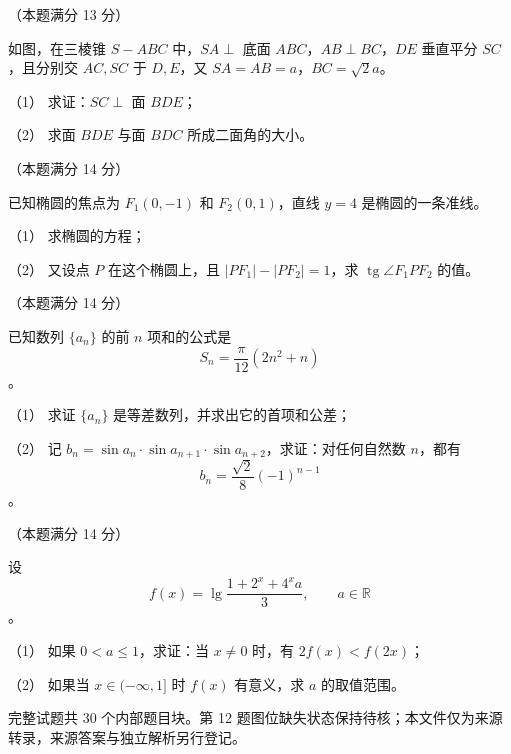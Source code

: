 \Needspace{0.4\textheight}
\begin{question}
（本题满分 13 分）

如图，在三棱锥 $S-ABC$ 中，$SA\perp$ 底面 $ABC$，$AB\perp BC$，$DE$ 垂直平分 $SC$，且分别交 $AC,SC$ 于 $D,E$，又 $SA=AB=a$，$BC=\sqrt2a$。

（1） 求证：$SC\perp$ 面 $BDE$；

（2） 求面 $BDE$ 与面 $BDC$ 所成二面角的大小。
\nopagebreak[4]
\begin{center}\end{center}
\nopagebreak[4]
\end{question}
\begin{question}
（本题满分 14 分）

已知椭圆的焦点为 $F_1(0,-1)$ 和 $F_2(0,1)$，直线 $y=4$ 是椭圆的一条准线。

（1） 求椭圆的方程；

（2） 又设点 $P$ 在这个椭圆上，且 $|PF_1|-|PF_2|=1$，求 $\operatorname{tg}\angle F_1PF_2$ 的值。

\end{question}
\begin{question}
（本题满分 14 分）

已知数列 $\{a_n\}$ 的前 $n$ 项和的公式是
\nopagebreak[4]
\[
S_n=\frac\pi{12}(2n^2+n)
\]
。

（1） 求证 $\{a_n\}$ 是等差数列，并求出它的首项和公差；

（2） 记 $b_n=\sin a_n\cdot\sin a_{n+1}\cdot\sin a_{n+2}$，求证：对任何自然数 $n$，都有
\nopagebreak[4]
\[
b_n=\frac{\sqrt2}{8}(-1)^{n-1}
\]
。

\end{question}
\begin{question}
（本题满分 14 分）

设
\nopagebreak[4]
\[
f(x)=\lg\frac{1+2^x+4^xa}{3},\qquad a\in\mathbb R
\]
。

（1） 如果 $0<a\le1$，求证：当 $x\ne0$ 时，有 $2f(x)<f(2x)$；

（2） 如果当 $x\in(-\infty,1]$ 时 $f(x)$ 有意义，求 $a$ 的取值范围。

\begin{gktip}
完整试题共 30 个内部题目块。第 12 题图位缺失状态保持待核；本文件仅为来源转录，来源答案与独立解析另行登记。
\end{gktip}

\end{question}